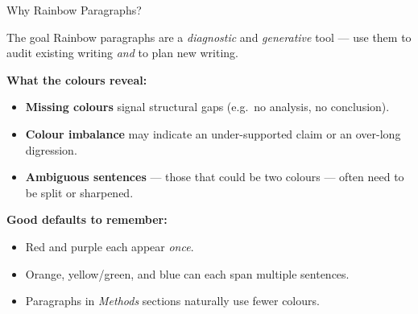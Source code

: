 \documentclass{beamer}
\begin{document}
\begin{frame}{Why Rainbow Paragraphs?}

  \footnotesize
  \begin{block}{The goal}
    Rainbow paragraphs are a \emph{diagnostic} and \emph{generative} tool ---
    use them to audit existing writing \emph{and} to plan new writing.
  \end{block}

  \medskip
  \textbf{What the colours reveal:}
  \begin{itemize}
    \item \textbf{Missing colours} signal structural gaps
      (e.g.\ no {\color{blue}analysis}, no {\color{purple}conclusion}).
    \item \textbf{Colour imbalance} may indicate an under-supported claim
      or an over-long digression.
    \item \textbf{Ambiguous sentences} --- those that could be two colours ---
      often need to be split or sharpened.
  \end{itemize}

  \medskip
  \textbf{Good defaults to remember:}
  \begin{itemize}
    \item {\color{red}Red} and {\color{purple}purple} each appear \emph{once}.
    \item {\color{orange}Orange}, {\color{yellow}yellow}/{\color{green}green}, and {\color{blue}blue}
      can each span multiple sentences.
    \item Paragraphs in \textit{Methods} sections naturally use fewer colours.
  \end{itemize}

\end{frame}
\end{document}
